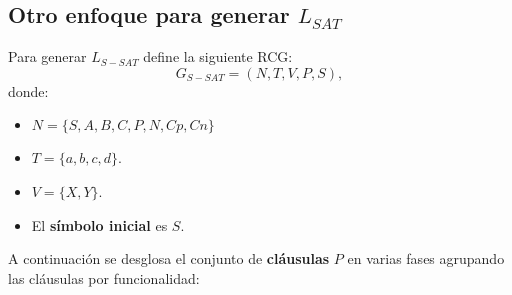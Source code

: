 \documentclass[12pt]{article}
\begin{document}
\subsection{Otro enfoque para generar $L_{SAT}$}

Para generar $L_{S-SAT}$ define la siguiente RCG:
\[
    G_{S-SAT} = (N, T, V, P, S),
\]
donde:

\begin{itemize}
    \item $N=\{S,A,B,C,P,N,Cp,Cn\}$
    \item $T=\{a,b,c,d\}$.
    \item $V=\{X,Y\}$.
    \item El \textbf{símbolo inicial} es $S$.
\end{itemize}

A continuación se desglosa el conjunto de \textbf{cláusulas} $P$ en varias fases agrupando las cláusulas
por funcionalidad:
\end{document}
